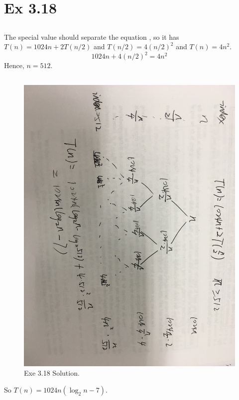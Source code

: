 \section{Ex 3.18}

\subsection{}
The special value should separate the equation , so it has $T(n) = 1024n + 2T(n/2)$ and $T(n/2) = 4(n/2)^2$  and  $T(n) = 4n^2$.
\begin{equation}
1024n + 4(n/2)^2 = 4n^2
\end{equation}
Hence, $n = 512$.


\subsection{}
\begin{figure}[h!]
  \includegraphics[width=\linewidth]{EX18.jpeg}
  \caption{Exe 3.18 Solution.}
  \label{fig:solution 3.18}
\end{figure}
So \quad $ T(n) = 1024n({\log_2 n} -7)$.


